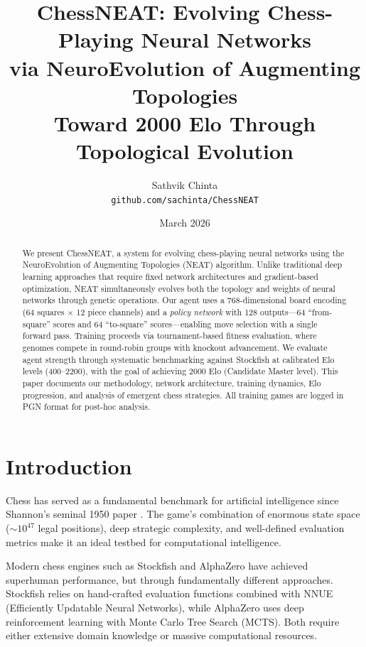 \documentclass[11pt, twocolumn]{article}
\title{
    \vspace{-1em}
    \textbf{ChessNEAT: Evolving Chess-Playing Neural Networks\\
    via NeuroEvolution of Augmenting Topologies}\\[0.3em]
    \large Toward 2000 Elo Through Topological Evolution
}
\author{
    Sathvik Chinta\\
    \texttt{github.com/sachinta/ChessNEAT}
}
\date{March 2026}
\begin{document}
\maketitle

\begin{abstract}
We present ChessNEAT, a system for evolving chess-playing neural networks using the NeuroEvolution of Augmenting Topologies (NEAT) algorithm. Unlike traditional deep learning approaches that require fixed network architectures and gradient-based optimization, NEAT simultaneously evolves both the topology and weights of neural networks through genetic operations. Our agent uses a 768-dimensional board encoding (64 squares $\times$ 12 piece channels) and a \emph{policy network} with 128 outputs---64 ``from-square'' scores and 64 ``to-square'' scores---enabling move selection with a single forward pass. Training proceeds via tournament-based fitness evaluation, where genomes compete in round-robin groups with knockout advancement. We evaluate agent strength through systematic benchmarking against Stockfish at calibrated Elo levels (400--2200), with the goal of achieving 2000 Elo (Candidate Master level). This paper documents our methodology, network architecture, training dynamics, Elo progression, and analysis of emergent chess strategies. All training games are logged in PGN format for post-hoc analysis.
\end{abstract}

\section{Introduction}
\label{sec:introduction}

Chess has served as a fundamental benchmark for artificial intelligence since Shannon's seminal 1950 paper \citep{shannon1950}. The game's combination of enormous state space ($\sim$$10^{47}$ legal positions), deep strategic complexity, and well-defined evaluation metrics make it an ideal testbed for computational intelligence.

Modern chess engines such as Stockfish \citep{stockfish2023} and AlphaZero \citep{silver2018} have achieved superhuman performance, but through fundamentally different approaches. Stockfish relies on hand-crafted evaluation functions combined with NNUE (Efficiently Updatable Neural Networks), while AlphaZero uses deep reinforcement learning with Monte Carlo Tree Search (MCTS). Both require either extensive domain knowledge or massive computational resources.
\end{document}
